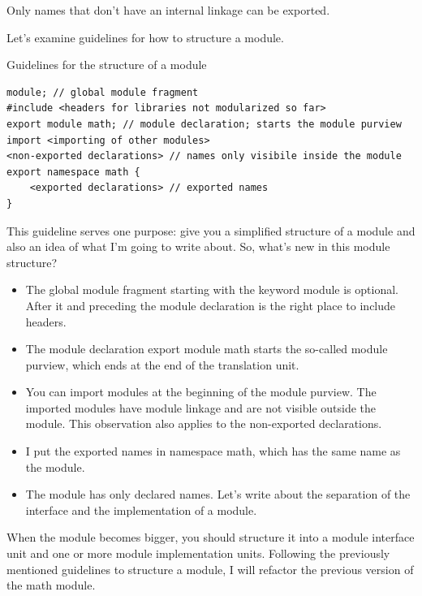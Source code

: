 Only names that don’t have an internal linkage can be exported.


Let’s examine guidelines for how to structure a module.

\noindent
Guidelines for the structure of a module
\begin{lstlisting}[style=styleCXX]
module; // global module fragment
#include <headers for libraries not modularized so far>
export module math; // module declaration; starts the module purview
import <importing of other modules>
<non-exported declarations> // names only visibile inside the module
export namespace math {
	<exported declarations> // exported names
}
\end{lstlisting}

This guideline serves one purpose: give you a simplified structure of a module and also an idea of what I’m going to write about. So, what’s new in this module structure?

\begin{itemize}
\item 
The global module fragment starting with the keyword module is optional. After it and preceding the module declaration is the right place to include headers.

\item 
The module declaration export module math starts the so-called module purview, which ends at the end of the translation unit.

\item 
You can import modules at the beginning of the module purview. The imported modules have module linkage and are not visible outside the module. This observation also applies to the non-exported declarations.

\item 
I put the exported names in namespace math, which has the same name as the module.

\item 
The module has only declared names. Let’s write about the separation of the interface and the implementation of a module.
\end{itemize}


When the module becomes bigger, you should structure it into a module interface unit and one or more module implementation units. Following the previously mentioned guidelines to structure a module, I will refactor the previous version of the math module.

